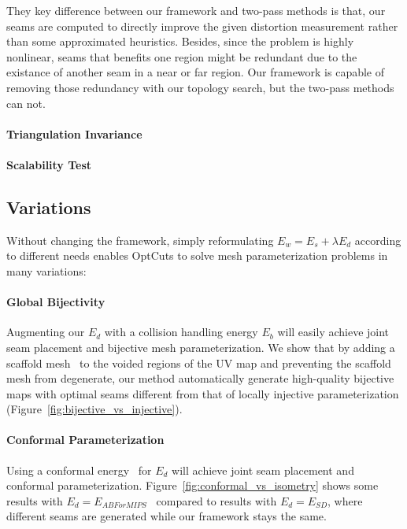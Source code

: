 They key difference between our framework and two-pass methods is that, our seams are computed to directly improve the given distortion measurement rather than some approximated heuristics. Besides, since the problem is highly nonlinear, seams that benefits one region might be redundant due to the existance of another seam in a near or far region. Our framework is capable of removing those redundancy with our topology search, but the two-pass methods can not.

\paragraph{Triangulation Invariance} 

\paragraph{Scalability Test} \minchen{[TODO]}

\subsection{Variations}
\label{sec:results_variations}

Without changing the framework, simply reformulating $E_w = E_s + \lambda E_d$ according to different needs enables OptCuts to solve mesh parameterization problems in many variations:

\paragraph{Global Bijectivity} \minchen{[DOING]} Augmenting our $E_d$ with a collision handling energy $E_b$ will easily achieve joint seam placement and bijective mesh parameterization. We show that by adding a scaffold mesh~\cite{Jiang2017Simplicial} to the voided regions of the UV map and preventing the scaffold mesh from degenerate, our method automatically generate high-quality bijective maps with optimal seams different from that of locally injective parameterization (Figure~\ref{fig:bijective_vs_injective}).

\paragraph{Conformal Parameterization} \minchen{[TODO]} Using a conformal energy~\cite{Hormann2000MIPS,Sheffer2005ABFPP} for $E_d$ will achieve joint seam placement and conformal parameterization. Figure~\ref{fig:conformal_vs_isometry} shows some results with $E_d = E_{ABForMIPS}$~\cite{} compared to results with $E_d = E_{SD}$, where different seams are generated while our framework stays the same.

